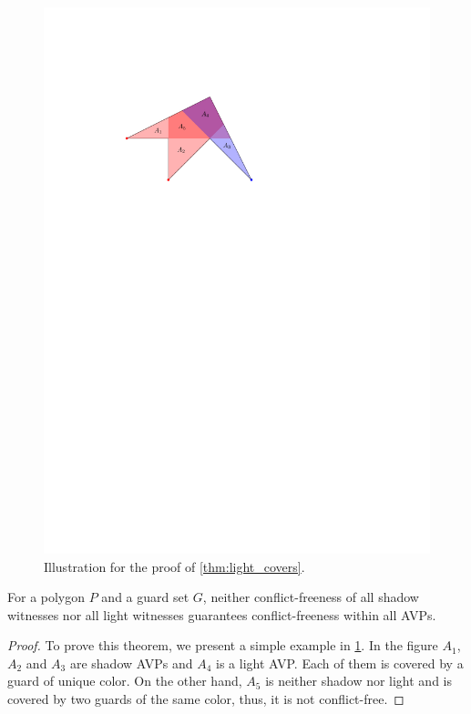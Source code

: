 \begin{figure}[htbp]
\centering
\includegraphics[scale=1.3]{Thesis/figures/conflict-free_witnesses.pdf}
\caption{Illustration for the proof of \cref{thm:light_covers}.}
\label{fig:light_covers}
\end{figure}

\begin{theorem}\label{thm:light_covers}
For a polygon $P$ and a guard set $G$, neither conflict-freeness of all shadow witnesses nor all light witnesses guarantees conflict-freeness within all AVPs.
\end{theorem}
\begin{proof}
To prove this theorem, we present a simple example in \cref{fig:light_covers}. In the figure $A_{1}$, $A_{2}$ and $A_{3}$ are shadow AVPs and $A_{4}$ is a light AVP. Each of them is covered by a guard of unique color. On the other hand, $A_{5}$ is neither shadow nor light and is covered by two guards of the same color, thus, it is not conflict-free.
\end{proof}

